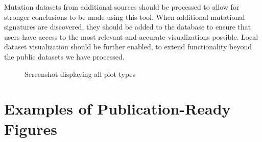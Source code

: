 \documentclass[12pt, letterpaper]{article}
\begin{document}
Mutation datasets from additional sources should be processed to allow for stronger conclusions to be made using this tool.
When additional mutational signatures are discovered, they should be added to the database to ensure that users have access to the most relevant and accurate visualizations possible.
Local dataset visualization should be further enabled, to extend functionality beyond the public datasets we have processed.


{}


\begin{figure}
    \centering
    \caption{Screenshot displaying all plot types}
\end{figure}

\pagebreak

\appendix                                     
\section{Examples of Publication-Ready Figures}
\renewcommand{\figurename}{Example Figure}
\setcounter{figure}{0}
\end{document}
